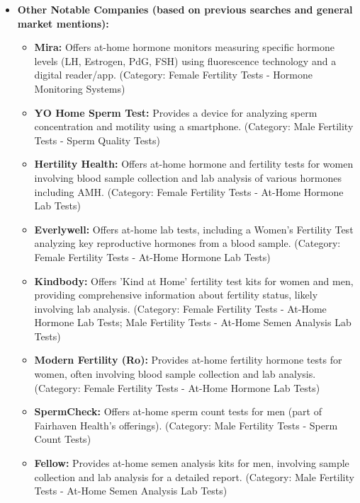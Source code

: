 \documentclass{article}
\begin{document}
\begin{itemize}[label=\textbullet]
    \item \textbf{Other Notable Companies (based on previous searches and general market mentions):}
    \begin{itemize}[label=--]
        \item \textbf{Mira:} Offers at-home hormone monitors measuring specific hormone levels (LH, Estrogen, PdG, FSH) using fluorescence technology and a digital reader/app. (Category: Female Fertility Tests - Hormone Monitoring Systems)
        \item \textbf{YO Home Sperm Test:} Provides a device for analyzing sperm concentration and motility using a smartphone. (Category: Male Fertility Tests - Sperm Quality Tests)
        \item \textbf{Hertility Health:} Offers at-home hormone and fertility tests for women involving blood sample collection and lab analysis of various hormones including AMH. (Category: Female Fertility Tests - At-Home Hormone Lab Tests)
        \item \textbf{Everlywell:} Offers at-home lab tests, including a Women's Fertility Test analyzing key reproductive hormones from a blood sample. (Category: Female Fertility Tests - At-Home Hormone Lab Tests)
        \item \textbf{Kindbody:} Offers 'Kind at Home' fertility test kits for women and men, providing comprehensive information about fertility status, likely involving lab analysis. (Category: Female Fertility Tests - At-Home Hormone Lab Tests; Male Fertility Tests - At-Home Semen Analysis Lab Tests)
        \item \textbf{Modern Fertility (Ro):} Provides at-home fertility hormone tests for women, often involving blood sample collection and lab analysis. (Category: Female Fertility Tests - At-Home Hormone Lab Tests)
        \item \textbf{SpermCheck:} Offers at-home sperm count tests for men (part of Fairhaven Health's offerings). (Category: Male Fertility Tests - Sperm Count Tests)
        \item \textbf{Fellow:} Provides at-home semen analysis kits for men, involving sample collection and lab analysis for a detailed report. (Category: Male Fertility Tests - At-Home Semen Analysis Lab Tests)
    \end{itemize}
    \vspace{0.5em} %

\end{itemize}
\end{document}
